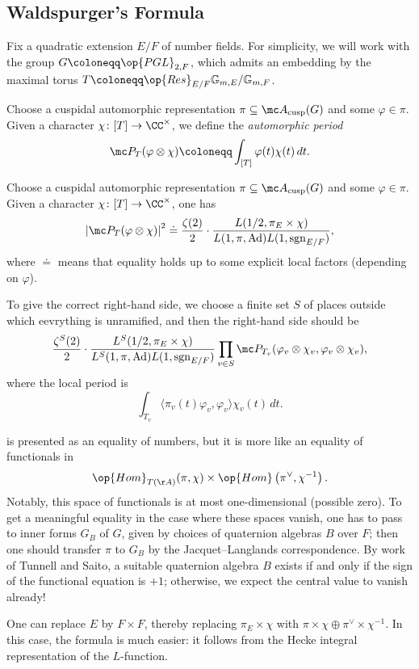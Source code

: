 \documentclass{article}
\begin{document}
\subsection{Waldspurger's Formula}
Fix a quadratic extension $E/F$ of number fields. For simplicity, we will work with the group $G\coloneqq\op{PGL}_{2,F}$, which admits an embedding by the maximal torus $T\coloneqq\op{Res}_{E/F}\mathbb G_{m,E}/\mathbb G_{m,F}$.
\begin{definition}
	Choose a cuspidal automorphic representation $\pi\subseteq\mc A_{\mathrm{cusp}}(G)$ and some $\varphi\in\pi$. Given a character $\chi\colon[T]\to\CC^\times$, we define the \textit{automorphic period}
	\[\mc P_T(\varphi\otimes\chi)\coloneqq\int_{[T]}\varphi(t)\chi(t)\,dt.\]
\end{definition}
\begin{theorem}[Waldspurger] \label{thm:waldspurger-formula}
	Choose a cuspidal automorphic representation $\pi\subseteq\mc A_{\mathrm{cusp}}(G)$ and some $\varphi\in\pi$. Given a character $\chi\colon[T]\to\CC^\times$, one has
	\[\left|\mc P_T(\varphi\otimes\chi)\right|^2\doteq\frac{\zeta(2)}2\cdot\frac{L(1/2,\pi_E\times\chi)}{L(1,\pi,\mathrm{Ad})L(1,\mathrm{sgn}_{E/F})},\]
	where $\doteq$ means that equality holds up to some explicit local factors (depending on $\varphi$).
\end{theorem}
\begin{remark}
	To give the correct right-hand side, we choose a finite set $S$ of places outside which eevrything is unramified, and then the right-hand side should be
	\[\frac{\zeta^S(2)}2\cdot\frac{L^S(1/2,\pi_E\times\chi)}{L^S(1,\pi,\mathrm{Ad})L(1,\mathrm{sgn}_{E/F})}\prod_{v\in S}\mc P_{T_v}(\varphi_v\otimes\chi_v,\varphi_v\otimes\chi_v),\]
	where the local period is
	\[\int_{T_v}\langle\pi_v(t)\varphi_v,\varphi_v\rangle\chi_v(t)\,dt.\]
\end{remark}
\begin{remark}
	 is presented as an equality of numbers, but it is more like an equality of functionals in
	\[\op{Hom}_{T(\AA)}(\pi,\chi)\times\op{Hom}\left(\pi^\lor,\chi^{-1}\right).\]
	Notably, this space of functionals is at most one-dimensional (possible zero). To get a meaningful equality in the case where these spaces vanish, one has to pass to inner forms $G_B$ of $G$, given by choices of quaternion algebras $B$ over $F$; then one should transfer $\pi$ to $G_B$ by the Jacquet--Langlands correspondence. By work of Tunnell and Saito, a suitable quaternion algebra $B$ exists if and only if the sign of the functional equation is $+1$; otherwise, we expect the central value to vanish already!
\end{remark}
\begin{remark}
	One can replace $E$ by $F\times F$, thereby replacing $\pi_E\times\chi$ with $\pi\times\chi\oplus\pi^\lor\times\chi^{-1}$. In this case, the formula is much easier: it follows from the Hecke integral representation of the $L$-function.
\end{remark}
\end{document}
